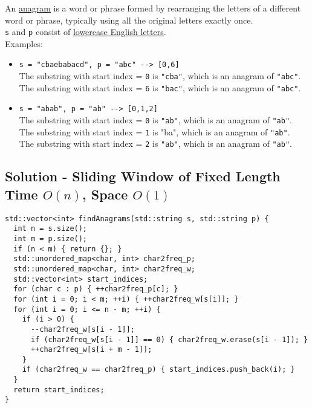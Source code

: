 {An \ul{anagram} is a word or phrase formed by rearranging the letters of a different word or phrase, typically using all the original letters exactly once.\\

{\colorbox{CodeBackground}{\lstinline|s|}} and {\colorbox{CodeBackground}{\lstinline|p|}} consist of \ul{lowercase English letters}.\\

Examples:
\begin{itemize}
\item {\colorbox{CodeBackground}{\lstinline|s = "cbaebabacd", p = "abc" --> [0,6]|}}\\
The substring with start index = {\colorbox{CodeBackground}{\lstinline|0|}} is {\colorbox{CodeBackground}{\lstinline|"cba"|}}, which is an anagram of {\colorbox{CodeBackground}{\lstinline|"abc"|}}.\\
The substring with start index = {\colorbox{CodeBackground}{\lstinline|6|}} is {\colorbox{CodeBackground}{\lstinline|"bac"|}}, which is an anagram of {\colorbox{CodeBackground}{\lstinline|"abc"|}}.
\item {\colorbox{CodeBackground}{\lstinline|s = "abab", p = "ab" --> [0,1,2]|}}\\
The substring with start index = {\colorbox{CodeBackground}{\lstinline|0|}} is {\colorbox{CodeBackground}{\lstinline|"ab"|}}, which is an anagram of {\colorbox{CodeBackground}{\lstinline|"ab"|}}.\\
The substring with start index = {\colorbox{CodeBackground}{\lstinline|1|}} is "ba", which is an anagram of {\colorbox{CodeBackground}{\lstinline|"ab"|}}.\\
The substring with start index = {\colorbox{CodeBackground}{\lstinline|2|}} is {\colorbox{CodeBackground}{\lstinline|"ab"|}}, which is an anagram of {\colorbox{CodeBackground}{\lstinline|"ab"|}}.
\end{itemize}

\subsection*{Solution - Sliding Window of Fixed Length {\scriptsize\color{gray}\Coffeecup\hspace{1mm}Time $O(n)$, Space $O(1)$}}
\begin{lstlisting}
std::vector<int> findAnagrams(std::string s, std::string p) {
  int n = s.size();
  int m = p.size();
  if (n < m) { return {}; }
  std::unordered_map<char, int> char2freq_p;
  std::unordered_map<char, int> char2freq_w;
  std::vector<int> start_indices;
  for (char c : p) { ++char2freq_p[c]; }
  for (int i = 0; i < m; ++i) { ++char2freq_w[s[i]]; }
  for (int i = 0; i <= n - m; ++i) {
    if (i > 0) {
      --char2freq_w[s[i - 1]];
      if (char2freq_w[s[i - 1]] == 0) { char2freq_w.erase(s[i - 1]); }
      ++char2freq_w[s[i + m - 1]];
    }
    if (char2freq_w == char2freq_p) { start_indices.push_back(i); }
  }
  return start_indices;
}
\end{lstlisting}

}
